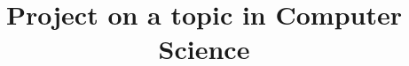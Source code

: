 \documentclass[a4paper, final]{oxcsproject}
\title{Project on a topic in Computer Science}
\begin{document}
\begin{romanpages}



	\maketitle


	\begin{acknowledgements}
		
	\end{acknowledgements}

	\begin{abstract}
		
	\end{abstract}

	\flushbottom

	\listoftodos

	\tableofcontents


	\printglossary[type=\acronymtype]

\end{romanpages}

\flushbottom
\end{document}
